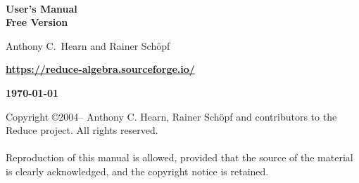 \begin{titlepage}
\setcounter{page}{-1}
\vspace*{\fill}
\begin{center}

{\Huge\bf {\REDUCE}} \\ [0.2cm]
{\LARGE\bf User's Manual\vspace{0.4cm} \\
  Free Version \\[0.5in]

}

\large\bf

Anthony C.\ Hearn %
and
Rainer Sch\"{o}pf

\vspace{0.1in}

\textbf{\url{https://reduce-algebra.sourceforge.io/}}

\vspace{0.5in}

\large\bf \today

\end{center}
\vspace{3.0in}
\end{titlepage}

\newpage
\vspace*{3.0in}
\noindent Copyright \copyright 2004--\the\year{} Anthony C. Hearn,
Rainer Sch\"{o}pf and contributors to the Reduce project.
All rights reserved. \\
\mbox{}\\
%
\noindent Reproduction of this manual is allowed, provided that the source of the
material is clearly acknowledged, and the copyright notice is retained.

